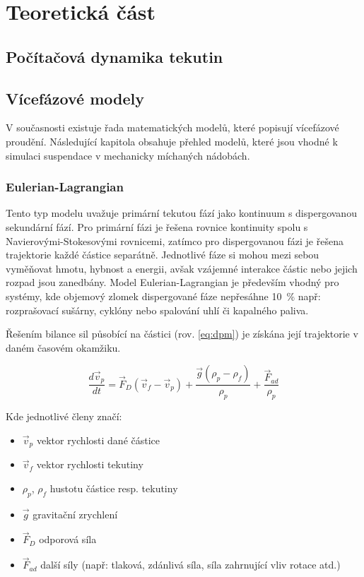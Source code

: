 \chapter{Teoretická část}

\section{Počítačová dynamika tekutin}

\section{Vícefázové modely}
V současnosti existuje řada matematických modelů, které popisují vícefázové proudění. Následující kapitola obsahuje přehled modelů, které jsou vhodné k simulaci suspendace v mechanicky míchaných nádobách.

\subsection{Eulerian-Lagrangian}
Tento typ modelu uvažuje primární tekutou fází jako kontinuum s dispergovanou sekundární fází. Pro primární fázi je řešena rovnice kontinuity spolu s Navierovými-Stokesovými rovnicemi, zatímco pro dispergovanou fázi je řešena trajektorie každé částice separátně. Jednotlivé fáze si mohou mezi sebou vyměňovat hmotu, hybnost a energii, avšak vzájemné interakce částic nebo jejich rozpad jsou zanedbány. Model Eulerian-Lagrangian je především vhodný pro systémy, kde objemový zlomek dispergované fáze nepřesáhne \SI{10}{\percent} např: rozprašovací sušárny, cyklóny nebo spalování uhlí či kapalného paliva. 

Řešením bilance sil působící na částici (rov. \ref{eq:dpm}) je získána její trajektorie v daném časovém okamžiku.

\begin{equation}
	\frac{d\vec{v}_{p}}{dt} = \vec{F}_{D}(\vec{v}_{f} - \vec{v}_{p}) + \frac{\vec{g}(\rho_{p} - \rho_{f})}{\rho_{p}} + \frac{\vec{F}_{ad}}{\rho_{p}}
	\label{eq:dpm}
\end{equation} 

\noindent Kde jednotlivé členy značí:

\begin{itemize}[itemsep=0pt,parsep=0pt,partopsep=0pt,topsep=0pt]
  \item $\vec{v}_{p}$ vektor rychlosti dané částice
  \item $\vec{v}_{f}$ vektor rychlosti tekutiny
  \item $\rho_{p}$, $\rho_{f}$ hustotu částice resp. tekutiny
  \item $\vec{g}$ gravitační zrychlení
  \item $\vec{F}_{D}$ odporová síla
  \item $\vec{F}_{ad}$ další síly (např: tlaková, zdánlivá síla, síla zahrnující vliv rotace atd.)
\end{itemize}

